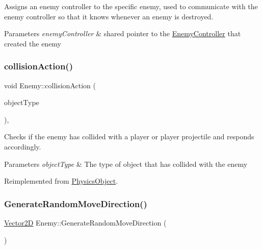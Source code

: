 Assigns an enemy controller to the specific enemy, used to communicate with the enemy controller so that it knows whenever an enemy is destroyed. 


\begin{DoxyParams}{Parameters}
{\em enemy\+Controller} & shared pointer to the \hyperlink{class_enemy_controller}{Enemy\+Controller} that created the enemy \\
\hline
\end{DoxyParams}
\mbox{\label{class_enemy_ac59660a58fac8d0ffdcb97c0717fa089}} 
\subsubsection{\texorpdfstring{collision\+Action()}{collisionAction()}}
{\footnotesize\ttfamily void Enemy\+::collision\+Action (\begin{DoxyParamCaption}\item[{const Game\+Object\+Type \&}]{object\+Type }\end{DoxyParamCaption})\hspace{0.3cm}{\ttfamily [override]}, {\ttfamily [virtual]}}



Checks if the enemy has collided with a player or player projectile and responds accordingly. 


\begin{DoxyParams}{Parameters}
{\em object\+Type} & The type of object that has collided with the enemy \\
\hline
\end{DoxyParams}


Reimplemented from \hyperlink{class_physics_object_a16163f4e5bf781b3814d024c9f44a276}{Physics\+Object}.

\mbox{\label{class_enemy_aa40cb40a3a2d83e82e02ee5cfbb9ee96}} 
\subsubsection{\texorpdfstring{Generate\+Random\+Move\+Direction()}{GenerateRandomMoveDirection()}}
{\footnotesize\ttfamily \hyperlink{class_vector2_d}{Vector2D} Enemy\+::\+Generate\+Random\+Move\+Direction (\begin{DoxyParamCaption}{ }\end{DoxyParamCaption})\hspace{0.3cm}{\ttfamily [private]}}



